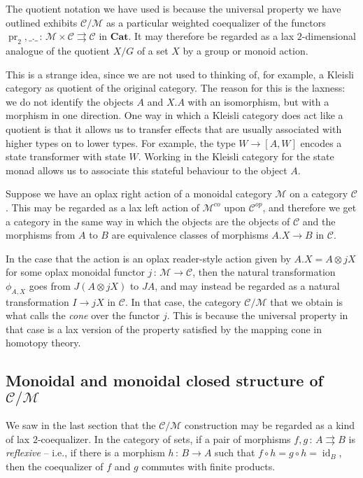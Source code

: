 \documentclass{svproc}
\newcommand\C{\mathcal{C}}
\newcommand\M{\mathcal{M}}
\DeclareMathOperator\pr{pr}
\DeclareMathOperator\id{id}
\newcommand\from{\,\colon\,}
\newcommand\tensor\otimes
\newcommand{\catname}[1]{\mathbf{#1}}
\newcommand{\Cat}{\catname{Cat}}
\begin{document}
\begin{remark}
  The quotient notation we have used is because the universal property we have outlined exhibits $\C/\M$ as a particular weighted coequalizer of the functors $\pr_2,\_.\_\from \M\times\C \rightrightarrows \C$ in $\Cat$.
  It may therefore be regarded as a lax $2$-dimensional analogue of the quotient $X/G$ of a set $X$ by a group or monoid action.  
  
  This is a strange idea, since we are not used to thinking of, for example, a Kleisli category as quotient of the original category.  
  The reason for this is the laxness: we do not identify the objects $A$ and $X.A$ with an isomorphism, but with a morphism in one direction.  
  One way in which a Kleisli category does act like a quotient is that it allows us to transfer effects that are usually associated with higher types on to lower types.  
  For example, the type $W\to [A,W]$ encodes a state transformer with state $W$.  
  Working in the Kleisli category for the state monad allows us to associate this stateful behaviour to the object $A$.
\end{remark}
\begin{remark}
  Suppose we have an oplax right action of a monoidal category $\M$ on a category $\C$.  
  This may be regarded as a lax left action of $\M^{co}$ upon $\C^{op}$, and therefore we get a category in the same way in which the objects are the objects of $\C$ and the morphisms from $A$ to $B$ are equivalence classes of morphisms $A.X \to B$ in $\C$.

  In the case that the action is an oplax reader-style action given by $A.X = A\tensor jX$ for some oplax monoidal functor $j\from \M \to \C$, then the natural transformation $\phi_{A,X}$ goes from $J(A\tensor jX)$ to $JA$, and may instead be regarded as a natural transformation $I\to jX$ in $\C$.  
  In that case, the category $\C/\M$ that we obtain is what \cite[4.3.11]{lurie2009} calls the \emph{cone} over the functor $j$.  
  This is because the universal property in that case is a lax version of the property satisfied by the mapping cone in homotopy theory.
\end{remark}

\subsection{Monoidal and monoidal closed structure of $\C/\M$}

We saw in the last section that the $\C/\M$ construction may be regarded as a kind of lax $2$-coequalizer.  
In the category of sets, if a pair of morphisms $f,g\from A \rightrightarrows B$ is \emph{reflexive} -- i.e., if there is a morphism $h\from B \to A$ such that $f\circ h = g\circ h = \id_B$, then the coequalizer of $f$ and $g$ commutes with finite products.  
\end{document}

